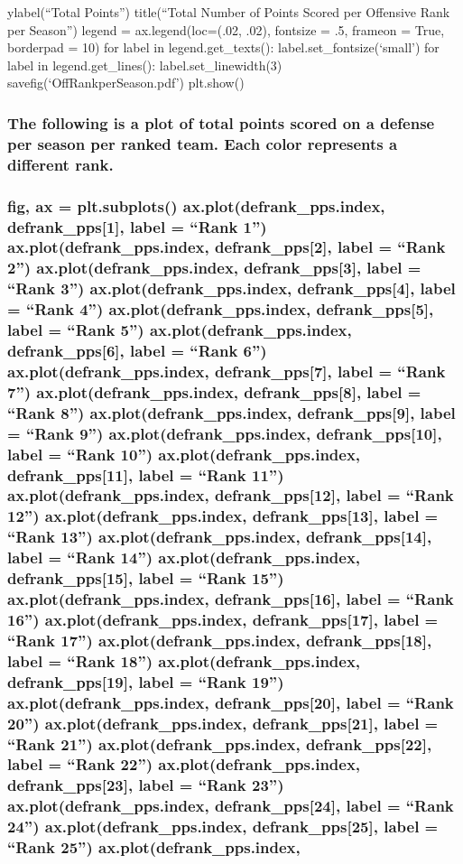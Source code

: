 \documentclass[letterpaper,10pt,english]{/anaconda/lib/python2.7/site-packages/sphinx/texinputs/sphinxhowto}
\begin{document}
{ylabel(``Total Points'') title(``Total Number of Points Scored per
Offensive Rank per Season'') legend = ax.legend(loc=(.02, .02), fontsize
= .5, frameon = True, borderpad = 10) for label in legend.get\_texts():
label.set\_fontsize(`small') for label in legend.get\_lines():
label.set\_linewidth(3) savefig(`OffRankperSeason.pdf') plt.show()}\subsubsection{The following is a plot of total points scored on a defense per season
per ranked team. Each color represents a different rank.}\subsubsection{fig, ax = plt.subplots() ax.plot(defrank\_pps.index,
defrank\_pps{[}1{]}, label = ``Rank 1'') ax.plot(defrank\_pps.index,
defrank\_pps{[}2{]}, label = ``Rank 2'') ax.plot(defrank\_pps.index,
defrank\_pps{[}3{]}, label = ``Rank 3'') ax.plot(defrank\_pps.index,
defrank\_pps{[}4{]}, label = ``Rank 4'') ax.plot(defrank\_pps.index,
defrank\_pps{[}5{]}, label = ``Rank 5'') ax.plot(defrank\_pps.index,
defrank\_pps{[}6{]}, label = ``Rank 6'') ax.plot(defrank\_pps.index,
defrank\_pps{[}7{]}, label = ``Rank 7'') ax.plot(defrank\_pps.index,
defrank\_pps{[}8{]}, label = ``Rank 8'') ax.plot(defrank\_pps.index,
defrank\_pps{[}9{]}, label = ``Rank 9'') ax.plot(defrank\_pps.index,
defrank\_pps{[}10{]}, label = ``Rank 10'') ax.plot(defrank\_pps.index,
defrank\_pps{[}11{]}, label = ``Rank 11'') ax.plot(defrank\_pps.index,
defrank\_pps{[}12{]}, label = ``Rank 12'') ax.plot(defrank\_pps.index,
defrank\_pps{[}13{]}, label = ``Rank 13'') ax.plot(defrank\_pps.index,
defrank\_pps{[}14{]}, label = ``Rank 14'') ax.plot(defrank\_pps.index,
defrank\_pps{[}15{]}, label = ``Rank 15'') ax.plot(defrank\_pps.index,
defrank\_pps{[}16{]}, label = ``Rank 16'') ax.plot(defrank\_pps.index,
defrank\_pps{[}17{]}, label = ``Rank 17'') ax.plot(defrank\_pps.index,
defrank\_pps{[}18{]}, label = ``Rank 18'') ax.plot(defrank\_pps.index,
defrank\_pps{[}19{]}, label = ``Rank 19'') ax.plot(defrank\_pps.index,
defrank\_pps{[}20{]}, label = ``Rank 20'') ax.plot(defrank\_pps.index,
defrank\_pps{[}21{]}, label = ``Rank 21'') ax.plot(defrank\_pps.index,
defrank\_pps{[}22{]}, label = ``Rank 22'') ax.plot(defrank\_pps.index,
defrank\_pps{[}23{]}, label = ``Rank 23'') ax.plot(defrank\_pps.index,
defrank\_pps{[}24{]}, label = ``Rank 24'') ax.plot(defrank\_pps.index,
defrank\_pps{[}25{]}, label = ``Rank 25'') ax.plot(defrank\_pps.index,
}
\end{document}
